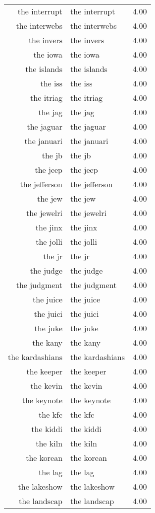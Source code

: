 \begin{table}[ht]
\begin{tabular}{rlr}
  the interrupt & the interrupt & 4.00 \\ 
  the interwebs & the interwebs & 4.00 \\ 
  the invers & the invers & 4.00 \\ 
  the iowa & the iowa & 4.00 \\ 
  the islands & the islands & 4.00 \\ 
  the iss & the iss & 4.00 \\ 
  the itriag & the itriag & 4.00 \\ 
  the jag & the jag & 4.00 \\ 
  the jaguar & the jaguar & 4.00 \\ 
  the januari & the januari & 4.00 \\ 
  the jb & the jb & 4.00 \\ 
  the jeep & the jeep & 4.00 \\ 
  the jefferson & the jefferson & 4.00 \\ 
  the jew & the jew & 4.00 \\ 
  the jewelri & the jewelri & 4.00 \\ 
  the jinx & the jinx & 4.00 \\ 
  the jolli & the jolli & 4.00 \\ 
  the jr & the jr & 4.00 \\ 
  the judge & the judge & 4.00 \\ 
  the judgment & the judgment & 4.00 \\ 
  the juice & the juice & 4.00 \\ 
  the juici & the juici & 4.00 \\ 
  the juke & the juke & 4.00 \\ 
  the kany & the kany & 4.00 \\ 
  the kardashians & the kardashians & 4.00 \\ 
  the keeper & the keeper & 4.00 \\ 
  the kevin & the kevin & 4.00 \\ 
  the keynote & the keynote & 4.00 \\ 
  the kfc & the kfc & 4.00 \\ 
  the kiddi & the kiddi & 4.00 \\ 
  the kiln & the kiln & 4.00 \\ 
  the korean & the korean & 4.00 \\ 
  the lag & the lag & 4.00 \\ 
  the lakeshow & the lakeshow & 4.00 \\ 
  the landscap & the landscap & 4.00 \\ 

\end{tabular}
\end{table}
